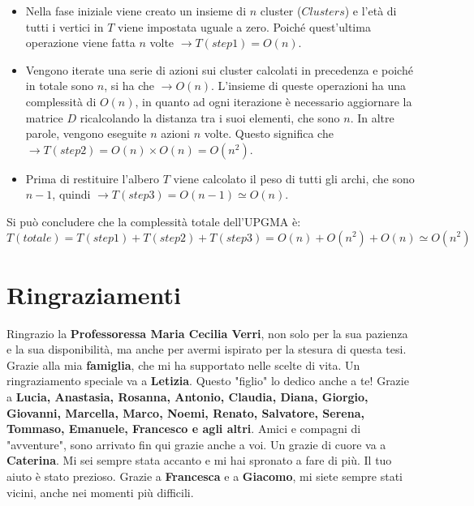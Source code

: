 \begin{itemize}
	\item Nella fase iniziale viene creato un insieme di $n$ cluster ($Clusters$) e l'età di tutti i vertici in $T$ viene impostata uguale a zero. Poiché quest'ultima operazione viene fatta $n$ volte $\rightarrow T(step1)=O(n)$.
	\item Vengono iterate una serie di azioni sui cluster calcolati in precedenza e poiché in totale sono $n$, si ha che $ \rightarrow O(n)$. L'insieme di queste operazioni ha una complessità di $O(n)$, in quanto ad ogni iterazione è necessario aggiornare la matrice $D$ ricalcolando la distanza tra i suoi elementi, che sono $n$. In altre parole, vengono eseguite $n$ azioni $n$ volte. Questo significa che $\rightarrow T(step2)=O(n) \times O(n) = O(n^2)$.
	\item Prima di restituire l'albero $T$ viene calcolato il peso di tutti gli archi, che sono $n-1$, quindi $\rightarrow T(step3)=O(n-1) \simeq O(n)$.
\end{itemize}
Si può concludere che la complessità totale dell'UPGMA è:
\[T(totale)=T(step1)+T(step2)+T(step3)=O(n)+O(n^2)+O(n)\simeq O(n^2)\]


\chapter*{Ringraziamenti}
 
Ringrazio la \textbf{Professoressa Maria Cecilia Verri}, non solo per la sua pazienza e la sua disponibilità, ma anche per avermi ispirato per la stesura di questa tesi.
\newline
\newline
Grazie alla mia \textbf{famiglia}, che mi ha supportato nelle scelte di vita.
\newline
\newline
Un ringraziamento speciale va a \textbf{Letizia}. Questo "figlio" lo dedico anche a te!
\newline
\newline
Grazie a \textbf{Lucia, Anastasia, Rosanna, Antonio, Claudia, Diana, Giorgio, Giovanni, Marcella, Marco, Noemi, Renato, Salvatore, Serena, Tommaso, Emanuele, Francesco e agli altri}. Amici e compagni di "avventure", sono arrivato fin qui grazie anche a voi.
\newline
\newline
Un grazie di cuore va a \textbf{Caterina}. Mi sei sempre stata accanto e mi hai spronato a fare di più. Il tuo aiuto è stato prezioso.
\newline
\newline
Grazie a \textbf{Francesca} e a \textbf{Giacomo}, mi siete sempre stati vicini, anche nei momenti più difficili.